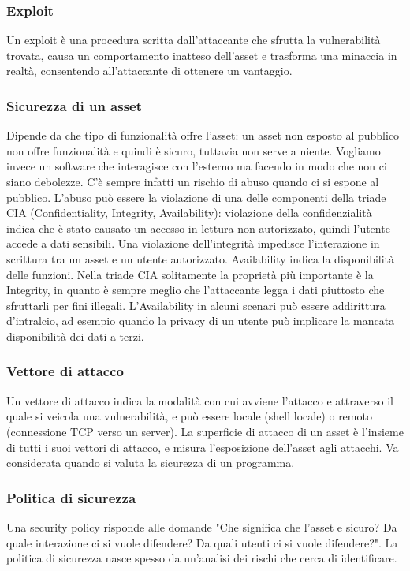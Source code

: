 \subsubsection{Exploit}
Un exploit è una procedura scritta dall'attaccante che sfrutta la vulnerabilità trovata, causa un comportamento inatteso dell'asset e trasforma una minaccia in realtà, consentendo all'attaccante di ottenere un vantaggio.

\subsubsection{Sicurezza di un asset}
Dipende da che tipo di funzionalità offre l'asset: un asset non esposto al pubblico non offre funzionalità e quindi è sicuro, tuttavia non serve a niente. Vogliamo invece un software che interagisce con l'esterno ma facendo in modo che non ci siano debolezze. C'è sempre infatti un rischio di abuso quando ci si espone al pubblico. L'abuso può essere la violazione di una delle componenti della triade CIA (Confidentiality, Integrity, Availability): violazione della confidenzialità indica che è stato causato un accesso in lettura non autorizzato, quindi l'utente accede a dati sensibili. Una violazione dell'integrità impedisce l'interazione in scrittura tra un asset e un utente autorizzato. Availability indica la disponibilità delle funzioni. Nella triade CIA solitamente la proprietà più importante è la Integrity, in quanto è sempre meglio che l'attaccante legga i dati piuttosto che sfruttarli per fini illegali. L'Availability in alcuni scenari può essere addirittura d'intralcio, ad esempio quando la privacy di un utente può implicare la mancata disponibilità dei dati a terzi.

\subsubsection{Vettore di attacco}
Un vettore di attacco indica la modalità con cui avviene l'attacco e attraverso il quale si veicola una vulnerabilità, e può essere locale (shell locale) o remoto (connessione TCP verso un server). La superficie di attacco di un asset è l'insieme di tutti i suoi vettori di attacco, e misura l'esposizione dell'asset agli attacchi. Va considerata quando si valuta la sicurezza di un programma.

\subsubsection{Politica di sicurezza}
Una security policy risponde alle domande "Che significa che l'asset e sicuro? Da quale interazione ci si vuole difendere? Da quali utenti ci si vuole difendere?". La politica di sicurezza nasce spesso da un'analisi dei rischi che cerca di identificare.

